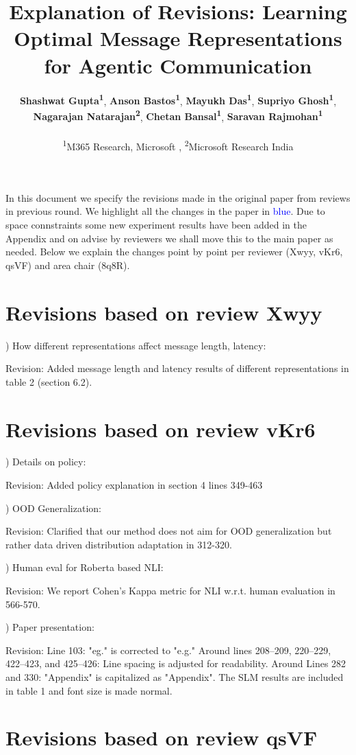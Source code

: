\documentclass[11pt]{article}
\title{Explanation of Revisions: Learning Optimal Message Representations for Agentic Communication}
\author{
 \textbf{Shashwat Gupta\textsuperscript{1}},
 \textbf{Anson Bastos\textsuperscript{1}},
 \textbf{Mayukh Das\textsuperscript{1}},
 \textbf{Supriyo Ghosh\textsuperscript{1}},
 \\
 \textbf{Nagarajan Natarajan\textsuperscript{2}},
 \textbf{Chetan Bansal\textsuperscript{1}},
 \textbf{Saravan Rajmohan\textsuperscript{1}}
\\
\\
 \textsuperscript{1}M365 Research, Microsoft ,
 \textsuperscript{2}Microsoft Research India
}
\begin{document}
\maketitle

In this document we specify the revisions made in the original paper from reviews in previous round. We highlight all the changes in the paper in \textcolor{blue}{blue}. Due to space connstraints some new experiment results have been added in the Appendix and on advise by reviewers we shall move this to the main paper as needed. Below we explain the changes point by point per reviewer (Xwyy, vKr6, qsVF) and area chair (8q8R).

\section{Revisions based on review Xwyy}
) How different representations affect message length, latency:

Revision: Added message length and latency results of different representations in table 2 (section 6.2).

\section{Revisions based on review vKr6}
) Details on policy:

Revision: Added policy explanation in section 4 lines 349-463

) OOD Generalization:

Revision: Clarified that our method does not aim for OOD generalization but rather data driven distribution adaptation in 312-320.

) Human eval for Roberta based NLI:

Revision: We report Cohen's Kappa metric for NLI w.r.t. human evaluation in 566-570.

) Paper presentation:

Revision: 
Line 103: "eg." is corrected to "e.g."
Around lines 208–209, 220–229, 422–423, and 425–426: Line spacing is adjusted for readability.
Around Lines 282 and 330: "Appendix" is capitalized as "Appendix".
The SLM results are included in table 1 and font size is made normal.

\section{Revisions based on review qsVF}
\end{document}
